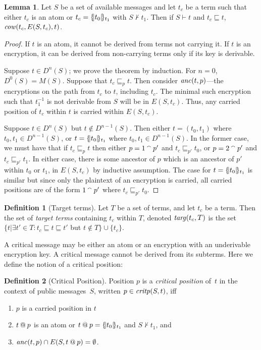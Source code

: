 \documentclass[12pt]{article}
\theoremstyle{definition}
\newtheorem{defn}{Definition}[section]
\newtheorem{lem}{Lemma}[section]
\newcommand{\critpos}{\fn{critp}}
\newcommand{\anc}{\fn{anc}}
\newcommand{\mcow}{\fn{cow}}
\begin{document}
\begin{lem}
\label{lem:escapeset}
Let $S$ be a set of available messages and let $t_c$ be a term such that either $t_c$ is an atom
or $t_c = \{\!|t_0|\!\}_{t_1}$ with $S \not\vdash t_1$.  Then if $S \vdash t$ and $t_c \sqsubseteq t$,
$\mcow(t_c,E(S,t_c),t)$.
\end{lem}

\begin{proof}
If $t$ is an atom, it cannot be derived from terms not carrying it.
If $t$ is an encryption, it can be derived from non-carrying terms
only if its key is derivable.

Suppose $t \in D^n(S)$; we prove the theorem by induction.  For $n =
0$, $D^0(S) = M(S)$.  Suppose that $t_c \sqsubseteq_p t$.  Then
consider $\anc(t,p)$---the
encryptions on the path from $t_c$ to $t$, including $t_c$.  The
minimal such encryption such that $t_1^{-1}$ is not derivable from $S$
will be in $E(S,t_c)$.  Thus, any carried position of $t_c$ within $t$
is carried within $E(S,t_c)$.

Suppose $t \in D^n(S)$ but $t \notin D^{n-1}(S)$.  Then either $t =
(t_0, t_1)$ where $t_0, t_1 \in D^{n-1}(S)$, or $t = \{\!|t_0|\!\}_{t_1}$
where $t_0, t_1 \in D^{n-1}(S)$.  In the former case, we must have
that if $t_c \sqsubseteq_p t$ then either $p = 1 \mathbin{{}^\smallfrown} p'$ and $t_c
\sqsubseteq_{p'} t_0$, or $p = 2 \mathbin{{}^\smallfrown} p'$ and $t_c \sqsubseteq_{p'}
t_1$.  In either case, there is some ancestor of $p$ which is an
ancestor of $p'$ within $t_0$ or $t_1$, in $E(S,t_c)$ by inductive
assumption.  The case for $t = \{\!|t_0|\!\}_{t_1}$ is similar but since
only the plaintext of an encryption is carried, all carried positions
are of the form $1 \mathbin{{}^\smallfrown} p'$ where $t_c \sqsubseteq_{p'} t_0$.
\end{proof}

\begin{defn}[Target terms]
Let $T$ be a set of terms, and let $t_c$ be a term.  Then the
set of {\em target terms} containing $t_c$ within $T$, denoted
$\operatorname{\mathit{targ}}(t_c,T)$ is the set
$\{t | \exists t' \in T: t_c \sqsubseteq t \sqsubseteq t'$ but $t \notin T\} \cup \{t_c\}$.
\end{defn}

A critical message may be either an atom or an encryption with an
underivable encryption key.  A critical message cannot be derived from
its subterms.  Here we define the notion of a critical position:

\begin{defn}[Critical Position]
Position $p$ is a \emph{critical position} of~$t$ in the context of
public messages~$S$, written $p\in\critpos(S,t)$, iff
\begin{enumerate}
\item $p$ is a carried position in $t$
\item $t \mathbin{@} p$ is an atom or $t \mathbin{@} p = \{\!|t_0|\!\}_{t_1}$ and $S \not\vdash t_1$, and
\item $\anc(t,p) \cap E(S,t \termat p) = \emptyset$.
\end{enumerate} \end{defn}
\end{document}
